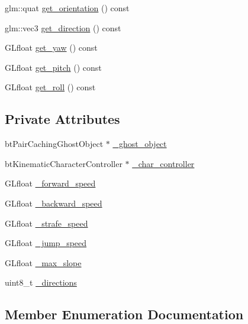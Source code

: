 \begin{DoxyCompactItemize}
glm\+::quat \hyperlink{classPhysicsPlayerController_a276711b873a6520fd01c4834c20bd37b}{get\+\_\+orientation} () const 
\item 
glm\+::vec3 \hyperlink{classPhysicsPlayerController_aa7ffb4df3b50b550f33d2d64a76ee57b}{get\+\_\+direction} () const 
\item 
G\+Lfloat \hyperlink{classPhysicsPlayerController_a1ffac5f72a1c4db9fb126e9c820615ef}{get\+\_\+yaw} () const 
\item 
G\+Lfloat \hyperlink{classPhysicsPlayerController_a5c16cff5a570099d9b4f4ed0d0939509}{get\+\_\+pitch} () const 
\item 
G\+Lfloat \hyperlink{classPhysicsPlayerController_a4f59ca49508ea75f5c608323e4af5019}{get\+\_\+roll} () const 
\end{DoxyCompactItemize}
\subsection*{Private Attributes}
\begin{DoxyCompactItemize}
\item 
bt\+Pair\+Caching\+Ghost\+Object $\ast$ \hyperlink{classPhysicsPlayerController_ac8839101912598ae6c620c76864665e1}{\+\_\+ghost\+\_\+object}
\item 
bt\+Kinematic\+Character\+Controller $\ast$ \hyperlink{classPhysicsPlayerController_acb97f8a1c4155bd6b269fc7276484dc5}{\+\_\+char\+\_\+controller}
\item 
G\+Lfloat \hyperlink{classPhysicsPlayerController_a765afe9efa2c07cce8c0531b2bc220c9}{\+\_\+forward\+\_\+speed}
\item 
G\+Lfloat \hyperlink{classPhysicsPlayerController_acba91da49b4a1fcd492624763376ae67}{\+\_\+backward\+\_\+speed}
\item 
G\+Lfloat \hyperlink{classPhysicsPlayerController_a0650942e3b59e8598ab70d649d9823a9}{\+\_\+strafe\+\_\+speed}
\item 
G\+Lfloat \hyperlink{classPhysicsPlayerController_a768842aa2f729fafe55ec1308708f006}{\+\_\+jump\+\_\+speed}
\item 
G\+Lfloat \hyperlink{classPhysicsPlayerController_a29cffd08733c1fb185ed3fdbfaa9e045}{\+\_\+max\+\_\+slope}
\item 
uint8\+\_\+t \hyperlink{classPhysicsPlayerController_a21fb45f73d246a1fa5c6aa36525d3a85}{\+\_\+directions}
\end{DoxyCompactItemize}


\subsection{Member Enumeration Documentation}
